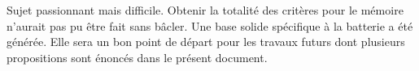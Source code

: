 Sujet passionnant mais difficile. Obtenir la totalité des critères pour le mémoire n’aurait pas pu être fait sans bâcler. Une base solide spécifique à la batterie a été générée. Elle sera un bon point de départ pour les travaux futurs dont plusieurs propositions sont énoncés dans le présent document.
